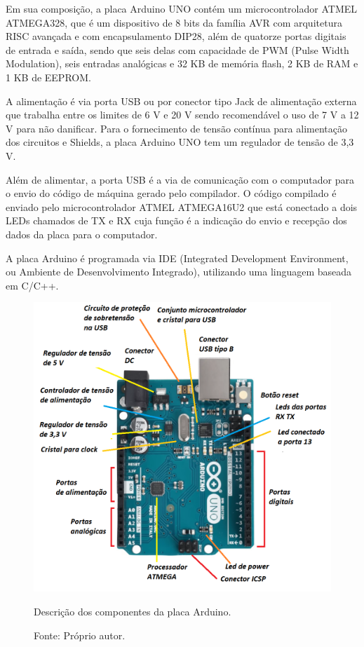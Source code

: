 Em sua composição, a placa Arduino UNO contém um microcontrolador ATMEL ATMEGA328, que é um dispositivo 
de 8 bits da família AVR com arquitetura RISC avançada e com encapsulamento DIP28, além de quatorze portas 
digitais de entrada e saída, sendo que seis delas com capacidade de PWM (Pulse Width Modulation), seis 
entradas analógicas e 32 KB de memória flash, 2 KB de RAM e 1 KB de EEPROM. 

A alimentação é via porta USB ou por conector tipo Jack de alimentação externa que trabalha entre os 
limites de 6 V e 20 V sendo recomendável o uso de 7 V a 12 V para não danificar. Para o fornecimento 
de tensão contínua para alimentação dos circuitos e Shields, a placa Arduino UNO tem um regulador de tensão de 3,3 V.

Além de alimentar, a porta USB é a via de comunicação com o computador para o envio do código de máquina 
gerado pelo compilador. O código compilado é enviado pelo microcontrolador ATMEL ATMEGA16U2 que está 
conectado a dois LEDs chamados de TX e RX cuja função é a indicação do envio e recepção dos dados da 
placa para o computador.

A placa Arduino é programada via IDE (Integrated Development Environment, ou Ambiente de Desenvolvimento 
Integrado), utilizando uma linguagem baseada em C/C++.

\begin{figure}[!htb]
\centering
\includegraphics[scale = 0.5]{figuras/3-12}
\caption{Descrição dos componentes da placa Arduino.}
\caption*{Fonte: Próprio autor.}
\label{figplacaarduino}
\end{figure}
    

